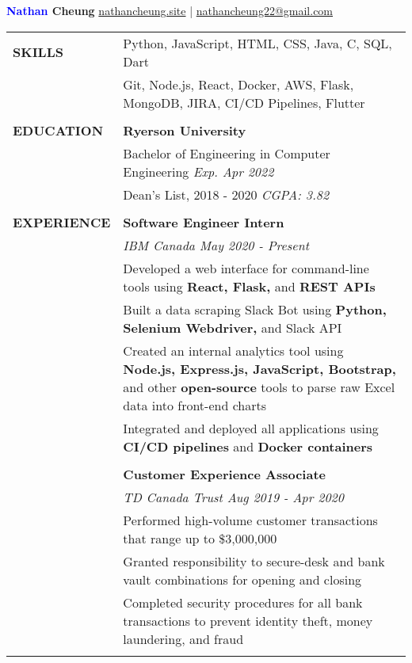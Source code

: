 \documentclass[letterpaper,11pt,oneside]{article}
\makeatletter
\newcommand\tabitem{\makebox[1em][r]{-~~}} %
\newcommand\tabspace{\makebox[1em][r]{~~~}} %
\newcommand{\header}{\noindent \huge{\textbf{\textcolor{blue}{Nathan} Cheung}} \hfill \normalsize{\href{https://nathancheung.site}{nathancheung.site} | \href{mailto:nathancheung22@gmail.com}{nathancheung22@gmail.com}} \\
\vspace{-2ex}
\hline 
\normalsize
\vspace{1.25em}}
\makeatother
\begin{document}
\header %


\noindent \begin{tabular}{@{}p{1.15in} p{6.08in}@{}}
 \textbf{SKILLS} 
     & Python, JavaScript, HTML, CSS, Java, C, SQL, Dart \\
     & Git, Node.js, React, Docker, AWS, Flask, MongoDB, JIRA, CI/CD Pipelines, Flutter \\
     & \\

 \textbf{EDUCATION}
     & \textbf{Ryerson University} \\
     & Bachelor of Engineering in Computer Engineering \hfill \textit{Exp. Apr 2022} \\
     & Dean's List, 2018 - 2020 \hfill \textit{CGPA: 3.82} \\
     & \\

 \textbf{EXPERIENCE} 
     & \textbf{Software Engineer Intern} \\
     & \textit{IBM Canada \hfill May 2020 - Present} \\
     & \tabitem Developed a web interface for command-line tools using \textbf{React, Flask,} and \textbf{REST APIs} \\
     & \tabitem Built a data scraping Slack Bot using \textbf{Python, Selenium Webdriver,} and Slack API \\
     & \tabitem Created an internal analytics tool using \textbf{Node.js, Express.js, JavaScript, Bootstrap,} and \tabspace other \textbf{open-source} tools to parse raw Excel data into front-end charts \\
     & \tabitem Integrated and deployed all applications using \textbf{CI/CD pipelines} and \textbf{Docker containers} \\
     & \\
 
     & \textbf{Customer Experience Associate} \\
     & \textit{TD Canada Trust \hfill Aug 2019 - Apr 2020} \\
     & \tabitem Performed high-volume customer transactions that range up to \$3,000,000 \\ 
     & \tabitem Granted responsibility to secure-desk and bank vault combinations for opening and closing \\
     & \tabitem Completed security procedures for all bank transactions to prevent identity theft, money \tabspace laundering, and fraud \\
     & \\
     

\end{tabular}
\end{document}
